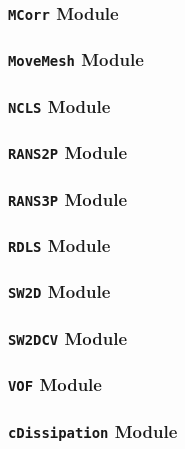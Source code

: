 \documentclass[letterpaper,12pt,english]{sphinxmanual}
\begin{document}
\subsubsection{\texttt{MCorr} Module}
\label{api/src:mcorr-module}

\subsubsection{\texttt{MoveMesh} Module}
\label{api/src:movemesh-module}

\subsubsection{\texttt{NCLS} Module}
\label{api/src:ncls-module}

\subsubsection{\texttt{RANS2P} Module}
\label{api/src:rans2p-module}

\subsubsection{\texttt{RANS3P} Module}
\label{api/src:rans3p-module}

\subsubsection{\texttt{RDLS} Module}
\label{api/src:rdls-module}

\subsubsection{\texttt{SW2D} Module}
\label{api/src:sw2d-module}

\subsubsection{\texttt{SW2DCV} Module}
\label{api/src:sw2dcv-module}

\subsubsection{\texttt{VOF} Module}
\label{api/src:vof-module}

\subsubsection{\texttt{cDissipation} Module}
\label{api/src:cdissipation-module}
\end{document}
